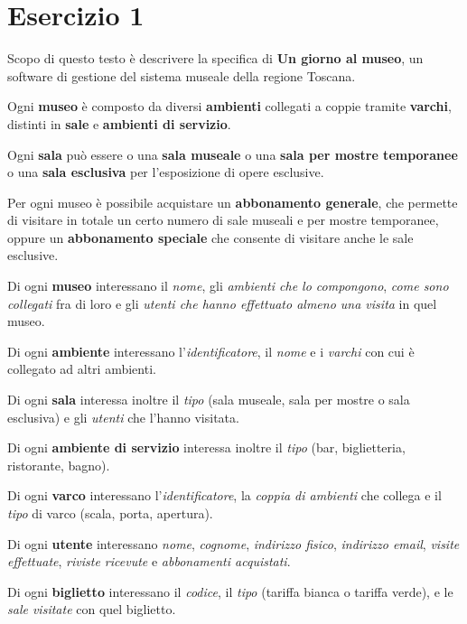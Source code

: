 \documentclass[10pt, italian, openany, landscape, fleqn]{book}
\begin{document}

\section{Esercizio 1}
Scopo di questo testo \`e descrivere la specifica di \textbf{Un giorno al museo}, un software di gestione del sistema museale
della regione Toscana.

Ogni \textbf{museo} \`e composto da diversi \textbf{ambienti} collegati a coppie tramite \textbf{varchi}, distinti in \textbf{sale} e \textbf{ambienti di servizio}.

Ogni \textbf{sala} pu\`o essere o una \textbf{sala museale} o una \textbf{sala per mostre temporanee} o una \textbf{sala esclusiva} per l'esposizione di opere
esclusive.

Per ogni museo \`e possibile acquistare un \textbf{abbonamento generale}, che permette di visitare in totale un certo numero di sale
museali e per mostre temporanee, oppure un \textbf{abbonamento speciale} che consente di visitare anche le sale esclusive.


Di ogni \textbf{museo} interessano il \textit{nome}, gli \textit{ambienti che lo compongono}, \textit{come sono collegati} fra di loro e gli \textit{utenti che hanno
effettuato almeno una visita} in quel museo.

Di ogni \textbf{ambiente} interessano l'\textit{identificatore}, il \textit{nome} e i \textit{varchi} con cui \`e collegato ad altri ambienti.

Di ogni \textbf{sala} interessa inoltre il \textit{tipo} (sala museale, sala per mostre o sala esclusiva) e gli \textit{utenti} che l'hanno visitata.

Di ogni \textbf{ambiente di servizio} interessa inoltre il \textit{tipo} (bar, biglietteria, ristorante, bagno).

Di ogni \textbf{varco} interessano l'\textit{identificatore}, la \textit{coppia di ambienti} che collega e il \textit{tipo} di varco (scala, porta, apertura).


Di ogni \textbf{utente} interessano \textit{nome}, \textit{cognome}, \textit{indirizzo fisico}, \textit{indirizzo email}, \textit{visite effettuate}, \textit{riviste ricevute} e \textit{abbonamenti acquistati}.

Di ogni \textbf{biglietto} interessano il \textit{codice}, il \textit{tipo} (tariffa bianca o tariffa verde), e le \textit{sale visitate} con quel biglietto.
\end{document}
